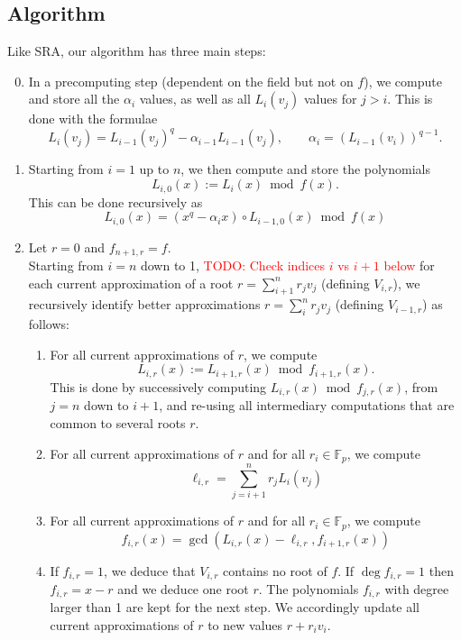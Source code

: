 \documentclass{sig-alternate}
\newcounter{algo}
\newcommand{\todo}[1]{\textcolor{red}{TODO: #1}}
\begin{document}
\subsection{Algorithm\label{sec:alg:alg}}
Like SRA, our algorithm has three main steps:
\begin{enumerate}
\setcounter{enumi}{-1}
\item In a precomputing step (dependent on the field but not on $f$), we compute and store all the $\alpha_i$ values, as well as all $L_i(v_{j})$ values for $j>i$. This is done with the formulae  
$$L_i(v_j)=L_{i-1}(v_j)^q-\alpha_{i-1}L_{i-1}(v_j), \qquad \alpha_i=(L_{i-1}(v_i))^{q-1}.$$
\item Starting from $i=1$ up to $n$, we then compute and store the polynomials
$$L_{i,0}(x):=L_i(x)\bmod f(x).$$
This can be done recursively as
$$L_{i,0}(x)=(x^q-\alpha_ix)\circ L_{i-1,0}(x)\bmod f(x)$$
\item 	Let $r=0$ and $f_{n+1,r}=f$. \\
Starting from $i=n$ down to 1, \todo{Check indices $i$ vs $i+1$ below} for each current approximation of a root $r=\sum_{i+1}^nr_jv_j$ (defining $V_{i,r}$), we recursively identify better approximations $r=\sum_{i}^nr_jv_j$ (defining $V_{i-1,r}$) as follows:
	\begin{enumerate}
	\item For all current approximations of $r$, we compute 
	$$L_{i,r}(x):=L_{i+1,r}(x)\bmod f_{i+1,r}(x).$$
	This is done by successively computing $L_{i,r}(x)\bmod f_{j,r}(x)$, from $j=n$ down to $i+1$, and re-using all intermediary computations that are common to several roots $r$.

	\item For all current approximations of $r$ and for all $r_i\in\mathbb{F}_p$, we compute 
	$$\ell_{i,r}=\sum_{j=i+1}^nr_jL_i(v_j)$$

	\item For all current approximations of $r$ and for all $r_i\in\mathbb{F}_p$, we compute 
	$$f_{i,r}(x)=\gcd(L_{i,r}(x)-\ell_{i,r},f_{i+1,r}(x))$$
	
	\item If $f_{i,r}=1$, we deduce that $V_{i,r}$ contains no root of $f$. If $\deg f_{i,r}=1$ then $f_{i,r}=x-r$ and we deduce one root $r$. The polynomials $f_{i,r}$ with degree larger than 1 are kept for the next step. We accordingly update all current approximations of $r$ to new values $r+r_iv_i$.

	\end{enumerate}

\end{enumerate}
\end{document}
